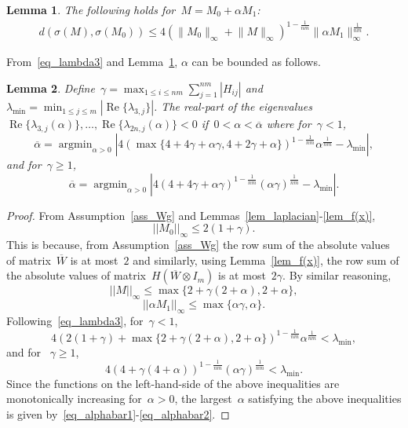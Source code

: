 \documentclass[letterpaper, 10pt, conference]{ieeeconf}
\newtheorem{lem}{Lemma}
\DeclareMathOperator*{\argmin}{argmin}
\begin{document}
\begin{lem} \label{eq_dbound}\cite{bhatia2013matrix}
The following holds for~${M = M_0 +\alpha M_1}$:
\begin{eqnarray*}
d(\sigma(M),\sigma(M_0))\leq 4(\lVert M_0\rVert_{\infty}+\lVert M\rVert_{\infty})^{1-\frac{1}{nm}} \lVert \alpha M_1\rVert_\infty^{\frac{1}{nm}}.
\end{eqnarray*}
\end{lem} 
From~\eqref{eq_lambda3} and Lemma~\ref{eq_dbound}, $\alpha$ can be bounded as follows.
\begin{lem} \label{lem_alphabar}
Define~${\gamma = \max_{1\leq i\leq nm} \sum_{j=1}^{nm} |H_{ij}|}$ and ${\lambda_{\min}=\min_{1\leq j\leq m}|\operatorname{Re}\{\lambda_{3,j}\}|}$. The real-part of the eigenvalues~${\operatorname{Re}\{\lambda_{3,j}(\alpha)\},\ldots,\operatorname{Re}\{\lambda_{2n,j}(\alpha)\}<0}$ if~$0<\alpha<\overline{\alpha}$ where for~$\gamma<1$,
\begin{equation} \label{eq_alphabar1}
\overline{\alpha} = \argmin_{\alpha>0} |4(\max\{4+4\gamma+\alpha\gamma, 4+2\gamma+\alpha\})^{1-\frac{1}{nm}} \alpha^{\frac{1}{nm}}-\lambda_{\min}|,
\end{equation}	
and for~$\gamma\geq 1$,		
\begin{equation} \label{eq_alphabar2}
\overline{\alpha} = \argmin_{\alpha>0} |4(4+4\gamma+\alpha\gamma)^{1-\frac{1}{nm}} (\alpha \gamma)^{\frac{1}{nm}}-\lambda_{\min}|.
\end{equation}
\end{lem}   
\begin{proof}
From Assumption~\ref{ass_Wg} and  Lemmas~\ref{lem_laplacian}-\ref{lem_f(x)},$$||M_0||_\infty\leq 2(1+\gamma).$$
This is because, from Assumption~\ref{ass_Wg} the row sum of the absolute values of matrix~$\overline{W}$ is at most~$2$ and similarly, using Lemma~\ref{lem_f(x)}, the row sum of the absolute values of matrix~$H(\overline{W} \otimes I_m)$ is at most~$2\gamma$. By similar reasoning, 
\[||M||_\infty\leq \max\{2+\gamma(2+\alpha), 2+\alpha\},
\]
\[||\alpha M_1||_\infty\leq \max\{\alpha \gamma, \alpha\}.\]
Following~\eqref{eq_lambda3}, for~$\gamma<1$,
\[ 4(2(1+\gamma)+\max\{2+\gamma(2+\alpha), 2+\alpha\})^{1-\frac{1}{nm}} \alpha^{\frac{1}{nm}}<\lambda_{\min},
	\]
and for ~$\gamma\geq1$,
\[ 4(4+\gamma(4+\alpha))^{1-\frac{1}{nm}} (\alpha \gamma)^{\frac{1}{nm}}<\lambda_{\min}.
\]		
Since the functions on the left-hand-side of the above inequalities are monotonically increasing for~$\alpha>0$, the largest~$\alpha$ satisfying the above inequalities is given  by~\eqref{eq_alphabar1}-\eqref{eq_alphabar2}.	
\end{proof}	
\end{document}
